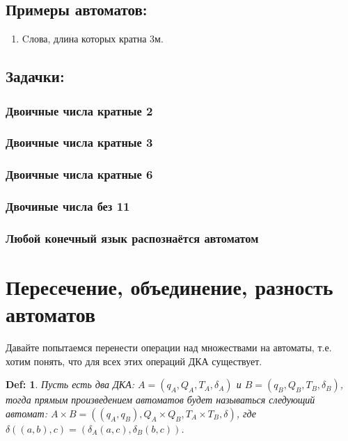 \documentclass[10pt,a4paper]{article}
\newtheorem{Def}{Def:}
\begin{document}
\subsection{Примеры автоматов:}

\begin{enumerate}
    \item Cлова, длина которых кратна 3м.
\end{enumerate}

\subsection{Задачки:}

\subsubsection{Двоичные числа кратные 2}

\subsubsection{Двоичные числа кратные 3}

\subsubsection{Двоичные числа кратные 6}

\subsubsection{Двочиные числа без 11}

\subsubsection{Любой конечный язык распознаётся автоматом}

\section{Пересечение, объединение, разность автоматов}

Давайте попытаемся перенести операции над множествами на автоматы,
т.е. хотим понять, что для всех этих операций ДКА существует.

\begin{Def}
    Пусть есть два ДКА: $A = (q_A, Q_A, T_A, \delta_A)$ и $B = (q_B, Q_B, T_B, \delta_B)$, тогда прямым произведением автоматов будет
    называться следующий автомат: $A \times B = ((q_A, q_B), Q_A \times Q_B, T_A \times T_B, \delta)$, где $\delta((a, b), c) = (\delta_A(a, c), \delta_B(b, c))$. 
\end{Def}
\end{document}
